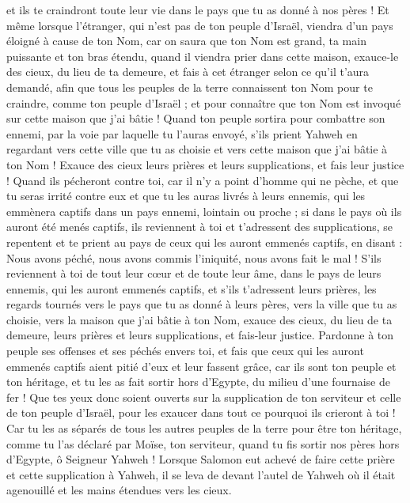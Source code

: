 \begin{multicols}{2}
et ils te craindront toute leur vie dans le pays que tu as donné à nos pères !
Et même lorsque l'étranger, qui n’est pas de ton peuple d'Israël, viendra d'un pays éloigné à cause de ton Nom,
car on saura que ton Nom est grand, ta main puissante et ton bras étendu, quand il viendra prier dans cette maison,
exauce-le des cieux, du lieu de ta demeure, et fais à cet étranger selon ce qu’il t’aura demandé, afin que tous les peuples de la terre connaissent ton Nom pour te craindre, comme ton peuple d'Israël ; et pour connaître que ton Nom est invoqué sur cette maison que j'ai bâtie !
Quand ton peuple sortira pour combattre son ennemi, par la voie par laquelle tu l’auras envoyé, s'ils prient Yahweh en regardant vers cette ville que tu as choisie et vers cette maison que j'ai bâtie à ton Nom !
Exauce des cieux leurs prières et leurs supplications, et fais leur justice !
Quand ils pécheront contre toi, car il n'y a point d'homme qui ne pèche, et que tu seras irrité contre eux et que tu les auras livrés à leurs ennemis, qui les emmènera captifs dans un pays ennemi, lointain ou proche ;
si dans le pays où ils auront été menés captifs, ils reviennent à toi et t’adressent des supplications, se repentent et te prient au pays de ceux qui les auront emmenés captifs, en disant : Nous avons péché, nous avons commis l’iniquité, nous avons fait le mal !
S'ils reviennent à toi de tout leur cœur et de toute leur âme, dans le pays de leurs ennemis, qui les auront emmenés captifs, et s'ils t'adressent leurs prières, les regards tournés vers le pays que tu as donné à leurs pères, vers la ville que tu as choisie, vers la maison que j'ai bâtie à ton Nom,
exauce des cieux, du lieu de ta demeure, leurs prières et leurs supplications, et fais-leur justice.
Pardonne à ton peuple ses offenses et ses péchés envers toi, et fais que ceux qui les auront emmenés captifs aient pitié d'eux et leur fassent grâce,
car ils sont ton peuple et ton héritage, et tu les as fait sortir hors d'Egypte, du milieu d'une fournaise de fer !
Que tes yeux donc soient ouverts sur la supplication de ton serviteur et celle de ton peuple d'Israël, pour les exaucer dans tout ce pourquoi ils crieront à toi !
Car tu les as séparés de tous les autres peuples de la terre pour être ton héritage, comme tu l’as déclaré par Moïse, ton serviteur, quand tu fis sortir nos pères hors d'Egypte, ô Seigneur Yahweh !
Lorsque Salomon eut achevé de faire cette prière et cette supplication à Yahweh, il se leva de devant l'autel de Yahweh où il était agenouillé et les mains étendues vers les cieux.

\end{multicols}
